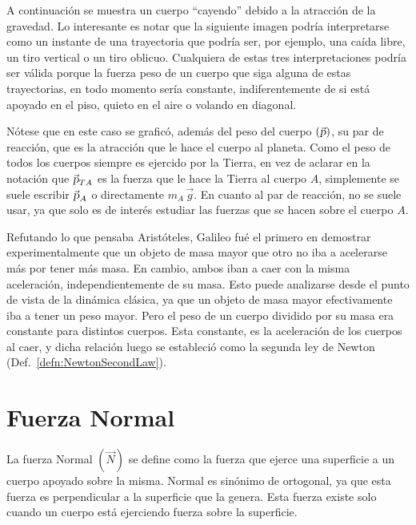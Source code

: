 \documentclass[a5paper,12pt,twoside]{book}
\begin{document}
A continuación se muestra un cuerpo ``cayendo'' debido a la atracción de la gravedad. Lo interesante es notar que la siguiente imagen podría interpretarse como un instante de una trayectoria que podría ser, por ejemplo, una caída libre, un tiro vertical o un tiro oblicuo. Cualquiera de estas tres interpretaciones podría ser válida porque la fuerza peso de un cuerpo que siga alguna de estas trayectorias, en todo momento sería constante, indiferentemente de si está apoyado en el piso, quieto en el aire o volando en diagonal.

\begin{center}
    \vspace{-6cm}
    \def\svgwidth{0.85\linewidth}
    
    \vspace{-2cm}
\end{center}

Nótese que en este caso se graficó, además del peso del cuerpo $(\Vec{\textsl{p}})$, su par de reacción, que es la atracción que le hace el cuerpo al planeta. Como el peso de todos los cuerpos siempre es ejercido por la Tierra, en vez de aclarar en la notación que $\Vec{\textsl{p}}_{TA}$ es la fuerza que le hace la Tierra al cuerpo $A$, simplemente se suele escribir $\Vec{\textsl{p}}_A$ o directamente $m_A \, \Vec{g}$. En cuanto al par de reacción, no se suele usar, ya que solo es de interés estudiar las fuerzas que se hacen sobre el cuerpo $A$.

Refutando lo que pensaba Aristóteles, Galileo fué el primero en demostrar experimentalmente que un objeto de masa mayor que otro no iba a acelerarse más por tener más masa. En cambio, ambos iban a caer con la misma aceleración, independientemente de su masa. Esto puede analizarse desde el punto de vista de la dinámica clásica, ya que un objeto de masa mayor efectivamente iba a tener un peso mayor. Pero el peso de un cuerpo dividido por su masa era constante para distintos cuerpos. Esta constante, es la aceleración de los cuerpos al caer, y dicha relación luego se estableció como la segunda ley de Newton (Def.\ \ref{defn:NewtonSecondLaw}).


\section{Fuerza Normal}

La fuerza Normal $(\Vec{N})$ se define como la fuerza que ejerce una superficie a un cuerpo apoyado sobre la misma. Normal es sinónimo de ortogonal, ya que esta fuerza es perpendicular a la superficie que la genera. Esta fuerza existe solo cuando un cuerpo está ejerciendo fuerza sobre la superficie.
\end{document}
